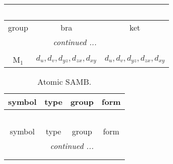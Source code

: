 \documentclass[fleqn,10pt,landscape]{article}
\begin{document}
\begin{itemize}
\begin{center}
\begin{longtable}{c|c|c}
\multicolumn{2}{l}{\tablename\ \thetable{}} \\
 \hline \hline
group & bra & ket \\ \hline \endhead

 \hline \hline
\multicolumn{2}{r}{\footnotesize\it continued ...} \\ \endfoot

 \hline \hline
\multicolumn{2}{r}{} \\ \endlastfoot

M$_{1}$ & $d_{u}, d_{v}, d_{yz}, d_{zx}, d_{xy}$ & $d_{u}, d_{v}, d_{yz}, d_{zx}, d_{xy}$ \\
\end{longtable}
\end{center}
\begin{center}
\renewcommand{\arraystretch}{1.3}
\begin{longtable}{c|c|c|c}
\caption{Atomic SAMB.}
 \\
 \hline \hline
symbol & type & group & form \\ \hline \endfirsthead

\multicolumn{3}{l}{\tablename\ \thetable{}} \\
 \hline \hline
symbol & type & group & form \\ \hline \endhead

 \hline \hline
\multicolumn{3}{r}{\footnotesize\it continued ...} \\ \endfoot

 \hline \hline
\multicolumn{3}{r}{} \\ \endlastfoot


\end{longtable}
\end{center}
\end{itemize}
\end{document}
